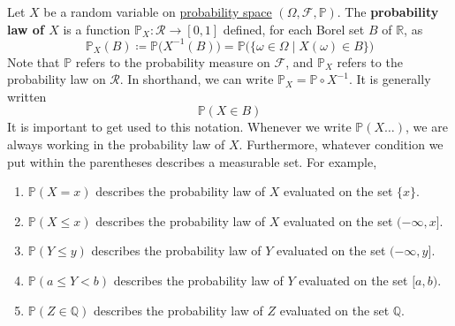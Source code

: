  \begin{definition}
    \label{def:probability-law-of-random-variable-x}
    Let $X$ be a random variable on \hyperref[def:probability-space]{probability space} $(\Omega, \mathcal{F}, \mathbb{P})$. The \textbf{probability law of $X$} is a function $\mathbb{P}_X : \mathcal{R} \to [0, 1]$ defined, for each Borel set $B$ of $\mathbb{R}$, as 
    \begin{equation}
      \mathbb{P}_X (B) \coloneqq \mathbb{P} \big( X^{-1}(B) \big) = \mathbb{P} \big( \{\omega \in \Omega \mid X(\omega) \in B\} \big)
    \end{equation}
    Note that $\mathbb{P}$ refers to the probability measure on $\mathcal{F}$, and $\mathbb{P}_X$ refers to the probability law on $\mathcal{R}$. In shorthand, we can write $\mathbb{P}_X = \mathbb{P} \circ X^{-1}$. It is generally written
    \begin{equation}
      \mathbb{P}(X \in B)
    \end{equation}
    It is important to get used to this notation. Whenever we write $\mathbb{P}(X \ldots)$, we are always working in the probability law of $X$. Furthermore, whatever condition we put within the parentheses describes a measurable set. For example, 
    \begin{enumerate}
      \item $\mathbb{P}(X = x)$ describes the probability law of $X$ evaluated on the set $\{x\}$. 
      \item $\mathbb{P}(X \leq x)$ describes the probability law of $X$ evaluated on the set $(-\infty, x]$. 
      \item $\mathbb{P}(Y \leq y)$ describes the probability law of $Y$ evaluated on the set $(-\infty, y]$.
      \item $\mathbb{P}(a \leq Y < b)$ describes the probability law of $Y$ evaluated on the set $[a, b)$. 
      \item $\mathbb{P}(Z \in \mathbb{Q})$ describes the probability law of $Z$ evaluated on the set $\mathbb{Q}$. 
    \end{enumerate}
  \end{definition}

